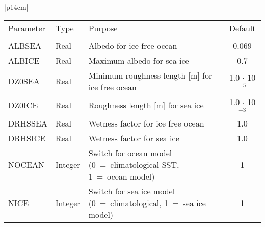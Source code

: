 \begin{center}
\begin{tabular}{|p{14cm}|}
\vspace{1mm} 

\begin{center}
\begin{tabular}{l l p{5cm} c}  %
Parameter & Type & Purpose & Default \\
&&&\\
ALBSEA & Real & Albedo for ice free ocean & 0.069 \\
ALBICE & Real & Maximum albedo for sea ice & 0.7 \\
DZ0SEA & Real & Minimum roughness length [m] for ice free ocean & 1.0 $\cdot$
10$^{-5}$
\\
DZ0ICE & Real & Roughness length [m] for sea ice & 1.0 $\cdot$ 10$^{-3}$ \\
DRHSSEA& Real & Wetness factor for ice free ocean & 1.0 \\
DRHSICE& Real & Wetness factor for sea ice & 1.0 \\
NOCEAN & Integer & Switch for ocean model (0~=~climatological SST, 1~=~ocean model)
& 1 \\
NICE & Integer & Switch for sea ice model (0~=~climatological, 1~=~sea ice model) & 1 \\
\end{tabular}
\end{center}
\end{tabular}
\end{center}

\newpage 

